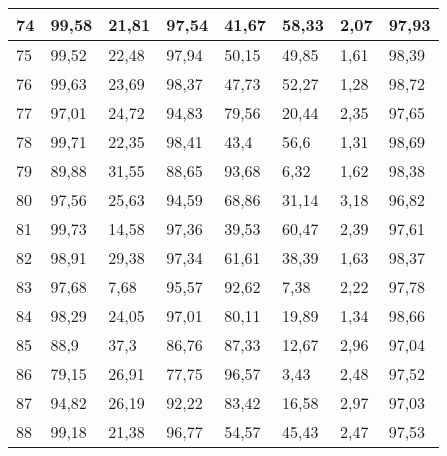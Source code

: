 \begin{longtable}[c]{|l|l|l|l|l|l|l|l|}
74              & 99,58        & 21,81        & 97,54       & 41,67         & 58,33         & 2,07          & 97,93         \\ \hline
75              & 99,52        & 22,48        & 97,94       & 50,15         & 49,85         & 1,61          & 98,39         \\ \hline
76              & 99,63        & 23,69        & 98,37       & 47,73         & 52,27         & 1,28          & 98,72         \\ \hline
77              & 97,01        & 24,72        & 94,83       & 79,56         & 20,44         & 2,35          & 97,65         \\ \hline
78              & 99,71        & 22,35        & 98,41       & 43,4          & 56,6          & 1,31          & 98,69         \\ \hline
79              & 89,88        & 31,55        & 88,65       & 93,68         & 6,32          & 1,62          & 98,38         \\ \hline
80              & 97,56        & 25,63        & 94,59       & 68,86         & 31,14         & 3,18          & 96,82         \\ \hline
81              & 99,73        & 14,58        & 97,36       & 39,53         & 60,47         & 2,39          & 97,61         \\ \hline
82              & 98,91        & 29,38        & 97,34       & 61,61         & 38,39         & 1,63          & 98,37         \\ \hline
83              & 97,68        & 7,68         & 95,57       & 92,62         & 7,38          & 2,22          & 97,78         \\ \hline
84              & 98,29        & 24,05        & 97,01       & 80,11         & 19,89         & 1,34          & 98,66         \\ \hline
85              & 88,9         & 37,3         & 86,76       & 87,33         & 12,67         & 2,96          & 97,04         \\ \hline
86              & 79,15        & 26,91        & 77,75       & 96,57         & 3,43          & 2,48          & 97,52         \\ \hline
87              & 94,82        & 26,19        & 92,22       & 83,42         & 16,58         & 2,97          & 97,03         \\ \hline
88              & 99,18        & 21,38        & 96,77       & 54,57         & 45,43         & 2,47          & 97,53         \\ \hline

\end{longtable}
